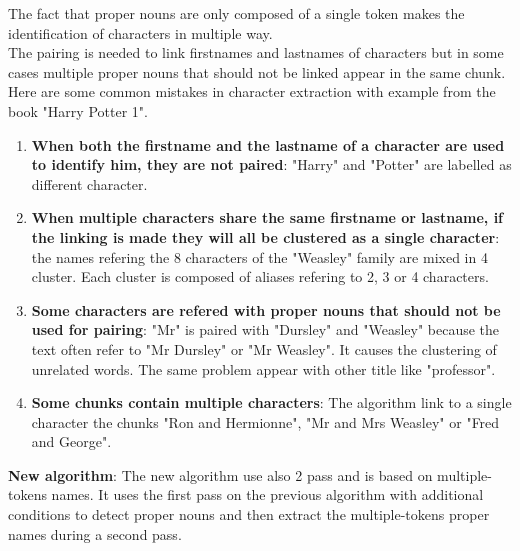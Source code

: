 \documentclass[a4paper, 12pt]{report}
\begin{document}
The fact that proper nouns are only composed of a single token makes the identification of characters in multiple way. \\
The pairing is needed to link firstnames and lastnames of characters but in some cases multiple proper nouns that should not be linked appear in the same chunk.\\  
Here are some common mistakes in character extraction with example from the book "Harry Potter 1".
\begin{enumerate}
    \item \textbf{When both the firstname and the lastname of a character are used to identify him, they are not paired}: "Harry" and "Potter" are labelled as different character.
    
    \item \textbf{When multiple characters share the same firstname or lastname, if the linking is made they will all be clustered as a single character}: the names refering the 8 characters of the "Weasley" family are mixed in 4 cluster. Each cluster is composed of aliases refering to 2, 3 or 4 characters.
    
    \item \textbf{Some characters are refered with proper nouns that should not be used for pairing}: "Mr" is paired with "Dursley" and "Weasley" because the text often refer to "Mr Dursley" or "Mr Weasley". It causes the clustering of unrelated words. The same problem appear with other title like "professor". 
    
    \item \textbf{Some chunks contain multiple characters}: The algorithm link to a single character the chunks "Ron and Hermionne", "Mr and Mrs Weasley" or "Fred and George".
    
\end{enumerate}


\textbf{New algorithm}: The new algorithm use also 2 pass and is based on multiple-tokens names. It uses the first pass on the previous algorithm with additional conditions to detect proper nouns and then extract the multiple-tokens proper names during a second pass.
\end{document}
